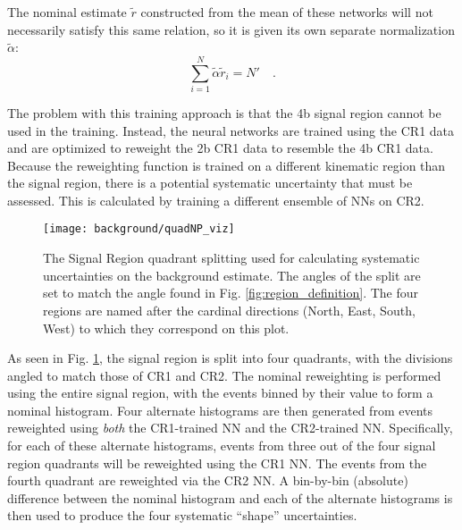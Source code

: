    The nominal estimate $\tilde{r}$ constructed from the mean of these networks will not necessarily satisfy this same relation,
        so it is given its own separate normalization $\tilde \alpha$:
        \begin{equation}
            \sum_{i=1}^{N} \tilde \alpha \tilde r_i = N'
            \quad.
        \end{equation}

    The problem with this training approach is that the 4b signal region cannot be used in the training.
    Instead, the neural networks are trained using the CR1 data
        and are optimized to reweight the 2b CR1 data to resemble the 4b CR1 data.
    Because the reweighting function is trained on a different kinematic region than the signal region,
        there is a potential systematic uncertainty that must be assessed.
    This is calculated by training a different ensemble of NNs on CR2.

    \begin{figure}[tbh]
        \texttt{[image: background/quadNP\_viz]}
        \caption{
            The Signal Region quadrant splitting used for calculating systematic uncertainties on the background estimate.
            The angles of the split are set to match the angle found in Fig. \ref{fig:region_definition}.
            The four regions are named after the cardinal directions (North, East, South, West)
                to which they correspond on this plot.
        }
        \label{fig:sig_quads}
    \end{figure}

    As seen in Fig. \ref{fig:sig_quads}, the signal region is split into four quadrants,
        with the divisions angled to match those of CR1 and CR2.
    The nominal reweighting is performed using the entire signal region,
        with the events binned by their \mhh value to form a nominal histogram.
    Four alternate histograms are then generated from events reweighted using
        \textit{both} the CR1-trained NN and the CR2-trained NN.
    Specifically, for each of these alternate histograms,
        events from three out of the four signal region quadrants will be reweighted using the CR1 NN.
    The events from the fourth quadrant are reweighted via the CR2 NN.
    A bin-by-bin (absolute) difference between the nominal histogram and each of the alternate histograms 
        is then used to produce the four systematic ``shape'' uncertainties.

